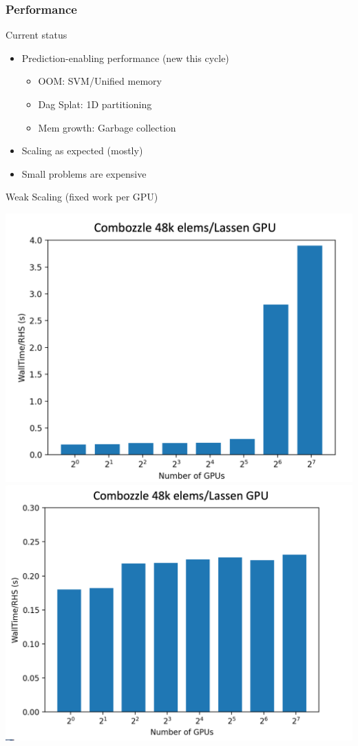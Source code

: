 \begin{frame}\frametitle{Performance}
\begin{center}
Current status
\end{center}
\begin{multicols}{2}
\begin{itemize}
\item Prediction-enabling performance (new this cycle)
\begin{itemize}
\item OOM: SVM/Unified memory
\item Dag Splat: 1D partitioning
\item Mem growth: Garbage collection
\end{itemize}
\item Scaling as expected (mostly)
\item Small problems are expensive
\end{itemize}
\end{multicols}
\begin{center}
Weak Scaling (fixed work per GPU)\\
\end{center}
\includegraphics[width=.48\textwidth]{figures/combozzle_weak_bad_partitioning.png}
\includegraphics[width=.48\textwidth]{figures/combozzle_weak_sliced_partitioning.png}
\end{frame}

